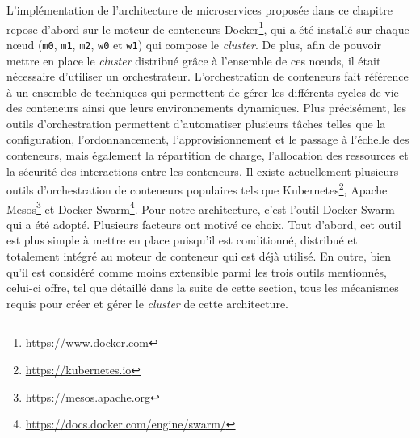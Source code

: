 L'implémentation de l'architecture de microservices proposée dans ce chapitre repose d'abord sur le moteur de conteneurs Docker\footnote{\url{https://www.docker.com}}, qui a été installé sur chaque n\oe{}ud (\texttt{m0}, \texttt{m1}, \texttt{m2}, \texttt{w0} et \texttt{w1}) qui compose le \textit{cluster}. De plus, afin de pouvoir mettre en place le \textit{cluster} distribué grâce à l'ensemble de ces n\oe{}uds, il était nécessaire d'utiliser un orchestrateur. L'orchestration de conteneurs fait référence à un ensemble de techniques qui permettent de gérer les différents cycles de vie des conteneurs ainsi que leurs environnements dynamiques. Plus précisément, les outils d'orchestration permettent d'automatiser plusieurs tâches telles que la configuration, l'ordonnancement, l'approvisionnement et le passage à l'échelle des conteneurs, mais également la répartition de charge, l'allocation des ressources et la sécurité des interactions entre les conteneurs. Il existe actuellement plusieurs outils d'orchestration de conteneurs populaires tels que Kubernetes\footnote{\url{https://kubernetes.io}}, Apache Mesos\footnote{\url{https://mesos.apache.org}} et Docker Swarm\footnote{\url{https://docs.docker.com/engine/swarm/}}. Pour notre architecture, c'est l'outil Docker Swarm qui a été adopté. Plusieurs facteurs ont motivé ce choix. Tout d'abord, cet outil est plus simple à mettre en place puisqu'il est conditionné, distribué et totalement intégré au moteur de conteneur qui est déjà utilisé. En outre, bien qu'il est considéré comme moins extensible parmi les trois outils mentionnés, celui-ci offre, tel que détaillé dans la suite de cette section, tous les mécanismes requis pour créer et gérer le \textit{cluster} de cette architecture.

